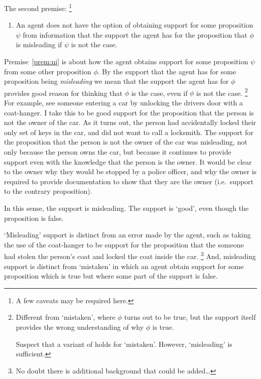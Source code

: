 \begin{note}[Inertia]
  The second premise:\nolinebreak
  \footnote{
    A few caveats may be required here.
  }
  \begin{enumerate}[label=\nI{}, ref=\nI{}]
  \item\label{prem:ni} An agent does not have the option of obtaining support for some proposition \(\psi\) from information that the support the agent has for the proposition that \(\phi\) is misleading if \(\psi\) is not the case.
  \end{enumerate}

  Premise~\ref{prem:ni} is about how the agent obtains support for some proposition \(\psi\) from some other proposition \(\phi\).
  By the support that the agent has for some proposition being \emph{misleading} we mean that the support the agent has for \(\phi\) provides good reason for thinking that \(\phi\) is the case, even if \(\phi\) is not the case.\nolinebreak
  \footnote{
    Different from `mistaken', where \(\phi\) turns out to be true, but the support itself provides the wrong understanding of why \(\phi\) is true.

    Suspect that a variant of \nI{} holds for `mistaken'.
    However, `misleading' is sufficient.
  }
  For example, see someone entering a car by unlocking the drivers door with a coat-hanger.
  I take this to be good support for the proposition that the person is not the owner of the car.
  As it turns out, the person had accidentally locked their only set of keys in the car, and did not want to call a locksmith.
  The support for the proposition that the person is not the owner of the car was misleading, not only because the person owns the car, but because it continues to provide support even with the knowledge that the person is the owner.
  It would be clear to the owner why they would be stopped by a police officer, and why the owner is required to provide documentation to show that they are the owner (i.e.\ support to the contrary proposition).

  In this sense, the support is misleading.
  The support is `good', even though the proposition is false.

  `Misleading' support is distinct from an error made by the agent, such as taking the use of the coat-hanger to be support for the proposition that the someone had stolen the person's coat and locked the coat inside the car.\nolinebreak
  \footnote{
    No doubt there is additional background that could be added\dots
  }
  And, misleading support is distinct from `mistaken' in which an agent obtain support for some proposition which is true but where some part of the support is false.


\end{note}
